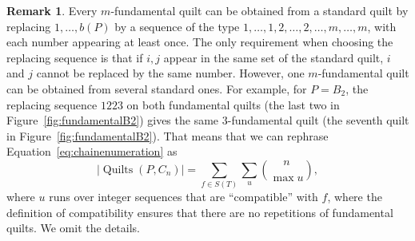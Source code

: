\documentclass[12pt]{amsart}
\newcommand{\matjaz}[1]{\todo[size=\tiny,inline,color=yellow!30]{#1 \\ \hfill --- M.}}
\newcommand{\sara}[1]{\todo[size=\tiny,inline,color=blue!30]{#1 \\
\hfill --- S.}}
\numberwithin{equation}{section}
\newtheorem{theorem}{Theorem}[section]
\theoremstyle{definition}
\newtheorem{defin}[theorem]{Definition}
\newtheorem{remark}[theorem]{Remark}
\newcommand{\quilt}{\operatorname{Quilts}}
\begin{document}

\begin{remark}
 Every $m$-fundamental quilt can be obtained from a standard quilt by replacing $1,\ldots,b(P)$ by a sequence of the type $1,\ldots,1,2,\ldots,2,\ldots,m,\ldots,m$, with each number appearing at least once. The only requirement when choosing the replacing sequence is that if $i,j$ appear in the same set of the standard quilt, $i$ and $j$ cannot be replaced by the same number. However, one $m$-fundamental quilt can be obtained from several standard ones. For example, for $P = B_2$, the replacing sequence $1223$ on both fundamental quilts (the last two in Figure~\ref{fig:fundamentalB2}) gives the same $3$-fundamental quilt (the seventh quilt in Figure~\ref{fig:fundamentalB2}). That means that we can rephrase Equation~\eqref{eq:chainenumeration} as
 $$|\quilt(P, C_n)| = \sum_{f \in S(T)} \sum_{u} \binom n {\max u},$$
 where $u$ runs over integer sequences that are ``compatible'' with $f$, where the definition of compatibility ensures that there are no repetitions of fundamental quilts. We omit the details.
\end{remark}
\end{document}
